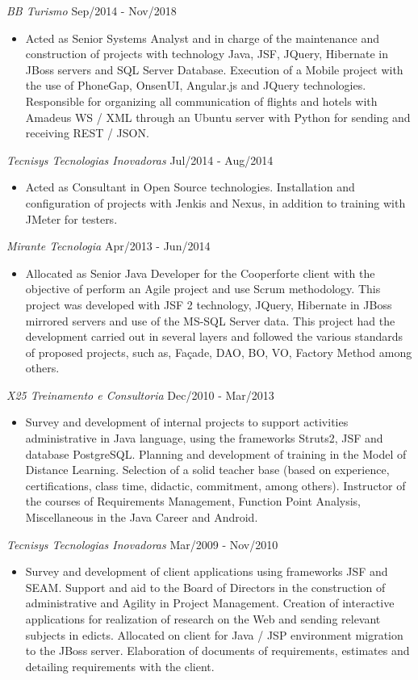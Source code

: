 \documentclass{res}
\begin{document}
\begin{resume}
		{\sl BB Turismo} \hfill Sep/2014 - Nov/2018
		\begin{itemize}
			\item Acted as Senior Systems Analyst and in charge of the maintenance and construction of projects with technology Java, JSF, JQuery, Hibernate in JBoss servers and SQL Server Database. Execution of a Mobile project with the use of PhoneGap, OnsenUI, Angular.js and JQuery technologies. Responsible for organizing all communication of flights and hotels with Amadeus WS / XML through an Ubuntu server with Python for sending and receiving REST / JSON.
		\end{itemize}
		
		{\sl Tecnisys Tecnologias Inovadoras} \hfill Jul/2014 - Aug/2014
		\begin{itemize}
			\item Acted as Consultant in Open Source technologies. Installation and configuration of projects with Jenkis and Nexus, in addition to training with JMeter for testers.
		\end{itemize}
		
		{\sl Mirante Tecnologia} \hfill Apr/2013 - Jun/2014
		\begin{itemize}
			\item Allocated as Senior Java Developer for the Cooperforte client with the objective of perform an Agile project and use Scrum methodology. This project was developed with JSF 2 technology, JQuery, Hibernate in JBoss mirrored servers and use of the MS-SQL Server data. This project had the development carried out in several layers and followed the various standards of proposed projects, such as, Façade, DAO, BO, VO, Factory Method among others.
		\end{itemize}
		
		{\sl X25 Treinamento e Consultoria} \hfill Dec/2010 - Mar/2013
		\begin{itemize}
			\item Survey and development of internal projects to support activities administrative in Java language, using the frameworks Struts2, JSF and database PostgreSQL. Planning and development of training in the Model of Distance Learning. Selection of a solid teacher base (based on experience, certifications, class time, didactic, commitment, among others). Instructor of the courses of Requirements Management, Function Point Analysis, Miscellaneous in the Java Career
			and Android.
		\end{itemize}
		
		{\sl Tecnisys Tecnologias Inovadoras} \hfill Mar/2009 - Nov/2010
		\begin{itemize}
			\item Survey and development of client applications using frameworks JSF and SEAM. Support and aid to the Board of Directors in the construction of administrative and Agility in Project Management. Creation of interactive applications for realization of research on the Web and sending relevant subjects in edicts. Allocated on client for Java / JSP environment migration to the JBoss server. Elaboration of documents of requirements, estimates and detailing requirements with the client.
		\end{itemize}
		

\end{resume}
\end{document}
